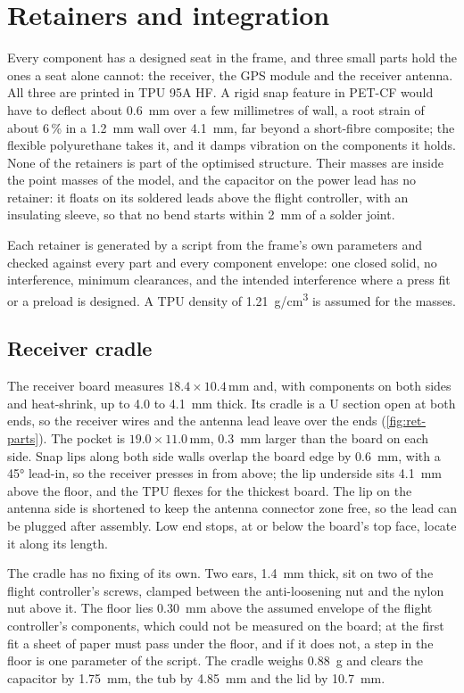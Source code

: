 \chapter{Retainers and integration}\label{sec:retainers}

Every component has a designed seat in the frame, and three small parts hold the ones a seat alone cannot: the receiver, the GPS module and the receiver antenna. All three are printed in TPU 95A HF. A rigid snap feature in PET-CF would have to deflect about \SI{0.6}{mm} over a few millimetres of wall, a root strain of about 6\,\% in a \SI{1.2}{mm} wall over \SI{4.1}{mm}, far beyond a short-fibre composite; the flexible polyurethane takes it, and it damps vibration on the components it holds. None of the retainers is part of the optimised structure. Their masses are inside the point masses of the model, and the capacitor on the power lead has no retainer: it floats on its soldered leads above the flight controller, with an insulating sleeve, so that no bend starts within \SI{2}{mm} of a solder joint.

Each retainer is generated by a script from the frame's own parameters and checked against every part and every component envelope: one closed solid, no interference, minimum clearances, and the intended interference where a press fit or a preload is designed. A TPU density of \SI{1.21}{g/cm^3} is assumed for the masses.

\section{Receiver cradle}\label{sec:ret-cradle}

The receiver board measures $18.4\times10.4$\,mm and, with components on both sides and heat-shrink, up to 4.0 to \SI{4.1}{mm} thick. Its cradle is a U section open at both ends, so the receiver wires and the antenna lead leave over the ends (\cref{fig:ret-parts}). The pocket is $19.0\times11.0$\,mm, \SI{0.3}{mm} larger than the board on each side. Snap lips along both side walls overlap the board edge by \SI{0.6}{mm}, with a \ang{45} lead-in, so the receiver presses in from above; the lip underside sits \SI{4.1}{mm} above the floor, and the TPU flexes for the thickest board. The lip on the antenna side is shortened to keep the antenna connector zone free, so the lead can be plugged after assembly. Low end stops, at or below the board's top face, locate it along its length.

The cradle has no fixing of its own. Two ears, \SI{1.4}{mm} thick, sit on two of the flight controller's screws, clamped between the anti-loosening nut and the nylon nut above it. The floor lies \SI{0.30}{mm} above the assumed envelope of the flight controller's components, which could not be measured on the board; at the first fit a sheet of paper must pass under the floor, and if it does not, a step in the floor is one parameter of the script. The cradle weighs \SI{0.88}{g} and clears the capacitor by \SI{1.75}{mm}, the tub by \SI{4.85}{mm} and the lid by \SI{10.7}{mm}.

